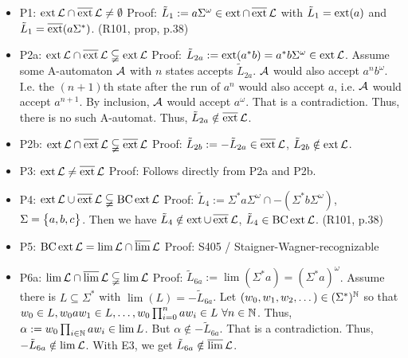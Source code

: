 \label{P:reg-star}
\begin{itemize}
\item P1: $\operatorname{ext} \mathcal{L} \cap \operatorname{\overline{ext}} \mathcal{L} \neq \emptyset$ \newline
Proof: $\tilde{L}_1 := a \Sigma^\omega \in \operatorname{ext} \cap \operatorname{\overline{ext}} \mathcal{L}$ with $\tilde{L}_1 = \operatorname{ext}(a)$ and $\tilde{L}_1 = \operatorname{\overline{ext}} (a \Sigma^*)$. (R101, prop, p.38)
\item P2a: $\operatorname{ext} \mathcal{L} \cap \operatorname{\overline{ext}} \mathcal{L} \subsetneqq \operatorname{ext} \mathcal{L}$ \newline
Proof: $\tilde{L}_{2a} := \operatorname{ext}(a^* b) = a^* b \Sigma^\omega \in \operatorname{ext} \mathcal{L}$. Assume some A-automaton $\mathcal{A}$ with $n$ states accepts $\tilde{L}_{2a}$. $\mathcal{A}$ would also accept $a^n b^\omega$. I.e. the $(n+1)$th state after the run of $a^n$ would also accept $a$, i.e. $\mathcal{A}$ would accept $a^{n+1}$. By inclusion, $\mathcal{A}$ would accept $a^\omega$. That is a contradiction. Thus, there is no such A-automat. Thus, $\tilde{L}_{2a} \notin \operatorname{\overline{ext}} \mathcal{L}$.
\item P2b: $\operatorname{ext} \mathcal{L} \cap \operatorname{\overline{ext}} \mathcal{L} \subsetneqq \operatorname{\overline{ext}} \mathcal{L}$ \newline
Proof: $\tilde{L}_{2b} := - \tilde{L}_{2a} \in \operatorname{\overline{ext}} \mathcal{L}$, $\tilde{L}_{2b} \notin \operatorname{ext} \mathcal{L}$.
\item P3: $\operatorname{ext} \mathcal{L} \neq \operatorname{\overline{ext}} \mathcal{L}$ \newline
Proof: Follows directly from P2a and P2b.
\item P4: $\operatorname{ext} \mathcal{L} \cup \operatorname{\overline{ext}} \mathcal{L} \subsetneqq \operatorname{BC} \operatorname{ext} \mathcal{L}$ \newline
Proof: $\tilde{L}_4 := \Sigma^* a \Sigma^\omega \cap -(\Sigma^* b \Sigma^\omega)$, $\Sigma = \Set{a,b,c}$. Then we have $\tilde{L}_4 \notin \operatorname{ext} \cup \operatorname{\overline{ext}} \mathcal{L}$, $\tilde{L}_4 \in \operatorname{BC} \operatorname{ext} \mathcal{L}$. (R101, p.38)
\item P5: $\operatorname{BC} \operatorname{ext} \mathcal{L} = \lim \mathcal{L} \cap \operatorname{\overline{lim}} \mathcal{L}$ \newline
Proof: S405 / Staigner-Wagner-recognizable
\item P6a: $\lim \mathcal{L} \cap \operatorname{\overline{lim}} \mathcal{L} \subsetneqq \lim \mathcal{L}$ \newline
Proof: $\tilde{L}_{6a} := \lim(\Sigma^* a) = (\Sigma^* a)^\omega$. Assume there is $L \subseteq \Sigma^*$ with $\lim(L) = -\tilde{L}_{6a}$. Let $(w_0,w_1,w_2,\dotsc) \in (\Sigma^*)^{\mathbb{N}}$ so that $w_0 \in L, w_0 a w_1 \in L, \dotsc, w_0 \prod_{i=0}^n a w_i \in L \ \forall n \in \mathbb{N}$. Thus, $\alpha := w_0 \prod_{i \in \mathbb{N}} a w_i \in \lim L$. But $\alpha \notin -\tilde{L}_{6a}$. That is a contradiction. Thus, $-\tilde{L}_{6a} \notin \lim \mathcal{L}$. With E3, we get $\tilde{L}_{6a} \notin \operatorname{\overline{lim}} \mathcal{L}$.

\end{itemize}
